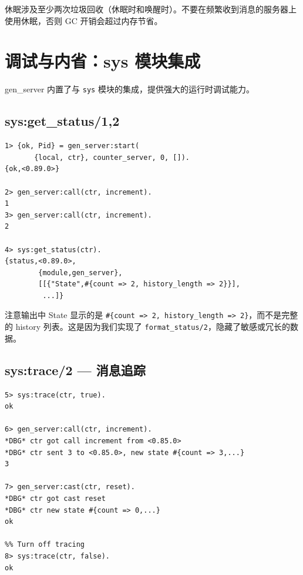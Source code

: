 \documentclass[a4paper,11pt]{article}
\begin{document}
\begin{warnbox}[休眠的代价]
休眠涉及至少两次垃圾回收（休眠时和唤醒时）。不要在频繁收到消息的服务器上使用休眠，否则 GC 开销会超过内存节省。
\end{warnbox}


\section{调试与内省：sys 模块集成}

gen\_server 内置了与 \texttt{sys} 模块的集成，提供强大的运行时调试能力。

\subsection{sys:get\_status/1,2}

\begin{lstlisting}[style=shellstyle, caption={获取服务器状态}]
1> {ok, Pid} = gen_server:start(
       {local, ctr}, counter_server, 0, []).
{ok,<0.89.0>}

2> gen_server:call(ctr, increment).
1
3> gen_server:call(ctr, increment).
2

4> sys:get_status(ctr).
{status,<0.89.0>,
        {module,gen_server},
        [[{"State",#{count => 2, history_length => 2}}],
         ...]}
\end{lstlisting}

\begin{notebox}
注意输出中 State 显示的是 \texttt{\#\{count => 2, history\_length => 2\}}，而不是完整的 history 列表。这是因为我们实现了 \texttt{format\_status/2}，隐藏了敏感或冗长的数据。
\end{notebox}

\subsection{sys:trace/2 --- 消息追踪}

\begin{lstlisting}[style=shellstyle, caption={开启消息追踪}]
5> sys:trace(ctr, true).
ok

6> gen_server:call(ctr, increment).
*DBG* ctr got call increment from <0.85.0>
*DBG* ctr sent 3 to <0.85.0>, new state #{count => 3,...}
3

7> gen_server:cast(ctr, reset).
*DBG* ctr got cast reset
*DBG* ctr new state #{count => 0,...}
ok

%% Turn off tracing
8> sys:trace(ctr, false).
ok
\end{lstlisting}
\end{document}

